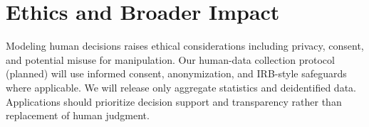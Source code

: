 \section{Ethics and Broader Impact}
Modeling human decisions raises ethical considerations including privacy, consent, and potential misuse for
manipulation. Our human-data collection protocol (planned) will use informed consent, anonymization, and
IRB-style safeguards where applicable. We will release only aggregate statistics and deidentified data.
Applications should prioritize decision support and transparency rather than replacement of human judgment.
